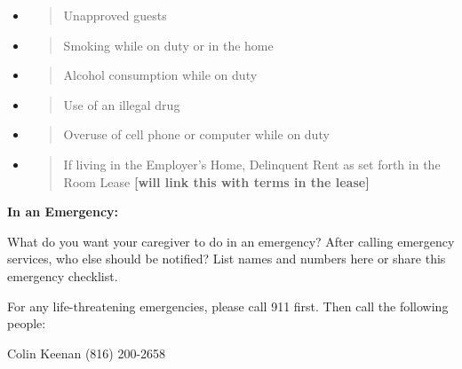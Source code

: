 \documentclass[]{article}
\begin{document}
\begin{itemize}
\item
  \begin{quote}
  Unapproved guests
  \end{quote}
\end{itemize}

\begin{itemize}
\item
  \begin{quote}
  Smoking while on duty or in the home
  \end{quote}
\end{itemize}

\begin{itemize}
\item
  \begin{quote}
  Alcohol consumption while on duty
  \end{quote}
\end{itemize}

\begin{itemize}
\item
  \begin{quote}
  Use of an illegal drug
  \end{quote}
\end{itemize}

\begin{itemize}
\item
  \begin{quote}
  Overuse of cell phone or computer while on duty
  \end{quote}
\end{itemize}

\begin{itemize}
\item
  \begin{quote}
  If living in the Employer's Home, Delinquent Rent as set forth in the
  Room Lease \textbf{{[}will link this with terms in the lease{]}}
  \end{quote}
\end{itemize}

\textbf{In an Emergency:}

What do you want your caregiver to do in an emergency? After calling
emergency services, who else should be notified? List names and numbers
here or share this emergency checklist.

For any life-threatening emergencies, please call 911 first. Then call
the following people:

Colin Keenan (816) 200-2658
\end{document}
